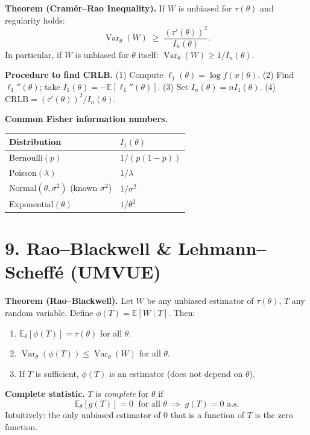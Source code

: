 \documentclass[11pt]{article}
\newcommand{\bbE}{\mathbb{E}}
\newcommand{\Var}{\operatorname{Var}}
\begin{document}
\medskip
\textbf{Theorem (Cramér--Rao Inequality).}
If $W$ is unbiased for $\tau(\theta)$ and regularity holds:
\[
  \Var_\theta(W) \;\geq\; \frac{(\tau'(\theta))^2}{I_n(\theta)}.
\]
In particular, if $W$ is unbiased for $\theta$ itself:
$\Var_\theta(W)\geq 1/I_n(\theta)$.

\medskip
\noindent\textbf{Procedure to find CRLB.}
(1) Compute $\ell_1(\theta) = \log f(x\mid\theta)$.
(2) Find $\ell_1''(\theta)$; take $I_1(\theta)=-\bbE[\ell_1''(\theta)]$.
(3) Set $I_n(\theta)=nI_1(\theta)$.
(4) $\mathrm{CRLB} = (\tau'(\theta))^2/I_n(\theta)$.

\medskip
\noindent\textbf{Common Fisher information numbers.}
\begin{tabular}{ll}
  \toprule
  Distribution & $I_1(\theta)$ \\
  \midrule
  Bernoulli$(p)$ & $1/(p(1-p))$ \\
  Poisson$(\lambda)$ & $1/\lambda$ \\
  Normal$(\theta,\sigma^2)$ (known $\sigma^2$) & $1/\sigma^2$ \\
  Exponential$(\theta)$ & $1/\theta^2$ \\
  \bottomrule
\end{tabular}

\section*{9.\; Rao--Blackwell \& Lehmann--Scheff\'e (UMVUE)}

\textbf{Theorem (Rao--Blackwell).}
Let $W$ be any unbiased estimator of $\tau(\theta)$, $T$ any random variable.
Define $\phi(T)=\bbE[W\mid T]$. Then:
\begin{enumerate}
  \item $\bbE_\theta[\phi(T)]=\tau(\theta)$ for all $\theta$.
  \item $\Var_\theta(\phi(T))\leq\Var_\theta(W)$ for all $\theta$.
  \item If $T$ is sufficient, $\phi(T)$ is an estimator (does not
    depend on $\theta$).
\end{enumerate}

\medskip
\textbf{Complete statistic.}
$T$ is \emph{complete} for $\theta$ if
\[
  \bbE_\theta[g(T)]=0\;\text{ for all }\theta \;\Longrightarrow\; g(T)=0\text{ a.s.}
\]
Intuitively: the only unbiased estimator of $0$ that is a function of $T$ is the zero function.
\end{document}
